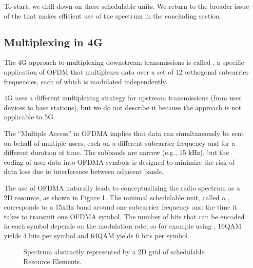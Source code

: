 \documentclass[a4paper,11pt,english]{sphinxmanual}
\let\sphinxpxdimen\pdfpxdimen\else\newdimen\sphinxpxdimen
\begin{document}
\sphinxAtStartPar
To start, we drill down on these schedulable units. We return to the
broader issue of the  that makes efficient use of the
spectrum in the concluding section.


\subsection{Multiplexing in 4G}
\label{\detokenize{primer:multiplexing-in-4g}}
\sphinxAtStartPar
The 4G approach to multiplexing downstream transmissions is called
, a specific
application of OFDM that multiplexes data over a set of 12 orthogonal
subcarrier frequencies, each of which is modulated independently.%
\begin{footnote}[1]\sphinxAtStartFootnote
4G uses a different multiplexing strategy for upstream
transmissions (from user devices to base stations), but we do
not describe it because the approach is not applicable to 5G.
%
\end{footnote} The
“Multiple Access” in OFDMA implies that data can simultaneously be
sent on behalf of multiple users, each on a different subcarrier
frequency and for a different duration of time. The subbands are
narrow (e.g., 15 kHz), but the coding of user data into OFDMA symbols
is designed to minimize the risk of data loss due to interference
between adjacent bands.

\sphinxAtStartPar
The use of OFDMA naturally leads to conceptualizing the radio spectrum
as a 2\sphinxhyphen{}D resource, as shown in \hyperref[\detokenize{primer:fig-sched-grid}]{Figure \ref{\detokenize{primer:fig-sched-grid}}}.
The minimal schedulable unit, called a ,
corresponds to a 15\sphinxhyphen{}kHz band around one subcarrier frequency and the
time it takes to transmit one OFDMA symbol. The number of bits that can
be encoded in each symbol depends on the modulation rate, so for example
using , 16\sphinxhyphen{}QAM yields 4 bits per
symbol and 64\sphinxhyphen{}QAM yields 6 bits per symbol.

\begin{figure}[ht]
\centering
\capstart

\noindent\sphinxincludegraphics[width=600\sphinxpxdimen]{{Slide12}.png}
\caption{Spectrum abstractly represented by a 2\sphinxhyphen{}D grid of
schedulable Resource Elements.}\label{\detokenize{primer:id8}}\label{\detokenize{primer:fig-sched-grid}}\end{figure}
\end{document}

